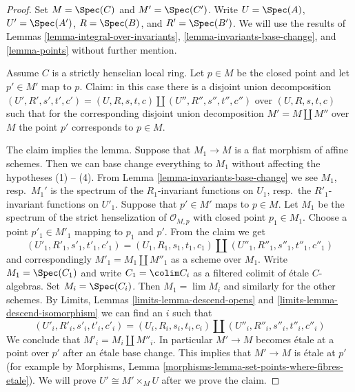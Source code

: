 \begin{proof}
Set $M = \Spec(C)$ and $M' = \Spec(C')$.
Write $U = \Spec(A)$, $U' = \Spec(A')$, $R = \Spec(B)$, and
$R' = \Spec(B')$. We will use the results of
Lemmas \ref{lemma-integral-over-invariants},
\ref{lemma-invariants-base-change}, and
\ref{lemma-points}
without further mention.

\medskip\noindent
Assume $C$ is a strictly henselian local ring. Let $p \in M$
be the closed point and let $p' \in M'$ map to $p$.
Claim: in this case there is a disjoint union decomposition
$(U', R', s', t', c') = (U, R, s, t, c) \amalg (U'', R'', s'', t'', c'')$
over $(U, R, s, t, c)$ such that for the corresponding
disjoint union decomposition $M' = M \amalg M''$ over $M$
the point $p'$ corresponds to $p \in M$.

\medskip\noindent
The claim implies the lemma. Suppose that $M_1 \to M$ is a flat morphism
of affine schemes. Then we can base change everything to $M_1$
without affecting the hypotheses (1) -- (4).
From Lemma \ref{lemma-invariants-base-change}
we see $M_1$, resp.\ $M_1'$ is the spectrum of the
$R_1$-invariant functions on $U_1$,
resp.\ the $R'_1$-invariant functions on $U'_1$.
Suppose that $p' \in M'$ maps to $p \in M$.
Let $M_1$ be the spectrum of the strict henselization of
$\mathcal{O}_{M, p}$ with closed point $p_1 \in M_1$.
Choose a point $p'_1 \in M'_1$ mapping to $p_1$ and $p'$.
From the claim we get
$$
(U'_1, R'_1, s'_1, t'_1, c'_1) =
(U_1, R_1, s_1, t_1, c_1) \amalg
(U''_1, R''_1, s''_1, t''_1, c''_1)
$$
and correspondingly $M'_1 = M_1 \amalg M''_1$ as a scheme over $M_1$.
Write $M_1 = \Spec(C_1)$ and write $C_1 = \colim C_i$ as a filtered
colimit of \'etale $C$-algebras. Set $M_i = \Spec(C_i)$.
Then $M_1 = \lim M_i$ and similarly for the other schemes.
By Limits, Lemmas \ref{limits-lemma-descend-opens} and
\ref{limits-lemma-descend-isomorphism}
we can find an $i$ such that
$$
(U'_i, R'_i, s'_i, t'_i, c'_i) =
(U_i, R_i, s_i, t_i, c_i) \amalg
(U''_i, R''_i, s''_i, t''_i, c''_i)
$$
We conclude that $M'_i = M_i \amalg M''_i$. In particular
$M' \to M$ becomes \'etale at a point over $p'$ after an
\'etale base change. This implies that $M' \to M$ is \'etale at $p'$
(for example by Morphisms, Lemma
\ref{morphisms-lemma-set-points-where-fibres-etale}).
We will prove $U' \cong M' \times_M U$ after we prove the claim.


\end{proof}
